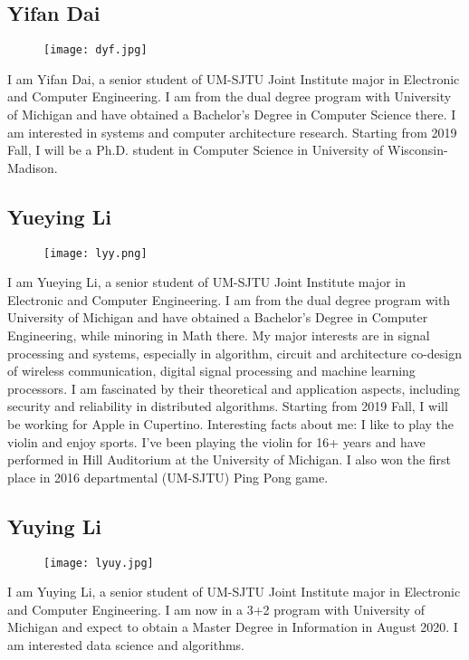 \subsection{Yifan Dai}
\begin{figure}[htbp]
  \centering \texttt{[image: dyf.jpg]}
  \label{fig:dyf}
\end{figure}
I am Yifan Dai, a senior student of UM-SJTU Joint Institute major in Electronic
and Computer Engineering. I am from the dual degree program with University of
Michigan and have obtained a Bachelor's Degree in Computer Science there. I am
interested in systems and computer architecture research. Starting from 2019
Fall, I will be a Ph.D. student in Computer Science in University of
Wisconsin-Madison.

\subsection{Yueying Li}
\begin{figure}[htbp]
  \centering \texttt{[image: lyy.png]}
  \label{fig:lyy}
\end{figure}
I am Yueying Li, a senior student of UM-SJTU Joint Institute major in
Electronic and Computer Engineering. I am from the dual degree program with
University of Michigan and have obtained a Bachelor's Degree in Computer
Engineering, while minoring in Math there. My major interests are in signal
processing and systems, especially in algorithm, circuit and architecture
co-design of wireless communication, digital signal processing and machine
learning processors. I am fascinated by their theoretical and application
aspects, including security and reliability in distributed algorithms. Starting
from 2019 Fall, I will be working for Apple in Cupertino.
Interesting facts about me: I like to play the violin and enjoy sports. I've
been playing the violin for 16+ years and have performed in Hill Auditorium at
the University of Michigan. I also won the first place in 2016 departmental
(UM-SJTU) Ping Pong game.

\subsection{Yuying Li}
\begin{figure}[htbp]
  \centering \texttt{[image: lyuy.jpg]}
  \label{fig:lyuy}
\end{figure}
I am Yuying Li, a senior student of UM-SJTU Joint Institute major in Electronic
and Computer Engineering. I am now in a 3+2 program with University of Michigan
and expect to obtain a Master Degree in Information in August 2020. I am
interested data science and algorithms.

